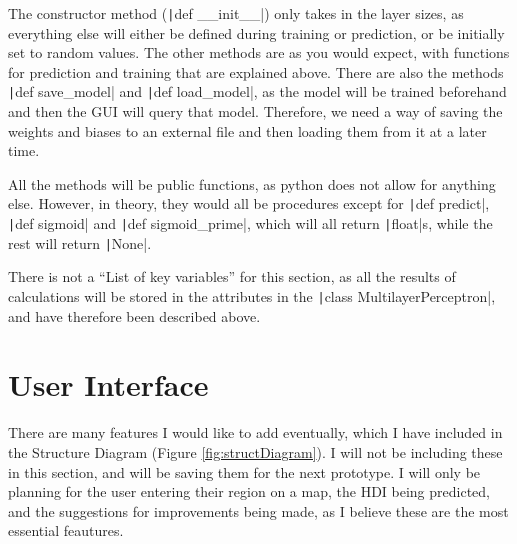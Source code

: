 \documentclass[12pt]{report}
\newcommand{\pil}[1]{\protect\texttt|#1|}
\begin{document}
The constructor method (\pil{def __init__}) only takes in the layer sizes, as everything else will either be defined during training or prediction, or be initially set to random values. The other methods are as you would expect, with functions for prediction and training that are explained above. There are also the methods \pil{def save_model} and \pil{def load_model}, as the model will be trained beforehand and then the GUI will query that model. Therefore, we need a way of saving the weights and biases to an external file and then loading them from it at a later time.

All the methods will be public functions, as python does not allow for anything else. However, in theory, they would all be procedures except for \pil{def predict}, \pil{def sigmoid} and \pil{def sigmoid_prime}, which will all return \pil{float}s, while the rest will return \pil{None}.

There is not a ``List of key variables'' for this section, as all the results of calculations will be stored in the attributes in the \pil{class MultilayerPerceptron}, and have therefore been described above.

\section{User Interface}\label{sec:ui}
There are many features I would like to add eventually, which I have included in the Structure Diagram (Figure \ref{fig:structDiagram}). I will not be including these in this section, and will be saving them for the next prototype. I will only be planning for the user entering their region on a map, the HDI being predicted, and the suggestions for improvements being made, as I believe these are the most essential feautures.
\end{document}
